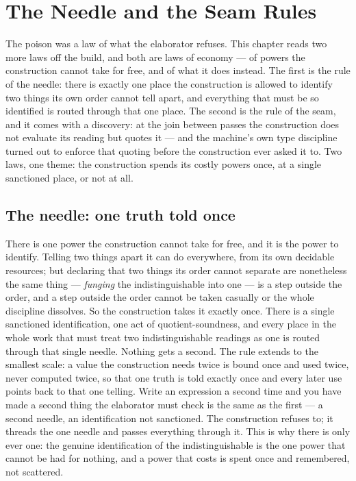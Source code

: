 \chapter{The Needle and the Seam Rules}
\label{chap:needle-and-seam-rules}

The poison was a law of what the elaborator refuses. This chapter reads two more laws off the build, and
both are laws of economy --- of powers the construction cannot take for free, and of what it does instead.
The first is the rule of the needle: there is exactly one place the construction is allowed to identify two
things its own order cannot tell apart, and everything that must be so identified is routed through that one
place. The second is the rule of the seam, and it comes with a discovery: at the join between passes the
construction does not evaluate its reading but quotes it --- and the machine's own type discipline turned
out to enforce that quoting before the construction ever asked it to. Two laws, one theme: the construction
spends its costly powers once, at a single sanctioned place, or not at all.

\section{The needle: one truth told once}
\label{se:the-needle-one-truth-told-once}

There is one power the construction cannot take for free, and it is the power to identify. Telling two
things apart it can do everywhere, from its own decidable resources; but declaring that two things its order
cannot separate are nonetheless the same thing --- \emph{funging} the indistinguishable into one --- is a
step outside the order, and a step outside the order cannot be taken casually or the whole discipline
dissolves. So the construction takes it exactly once. There is a single sanctioned identification, one act
of quotient-soundness, and every place in the whole work that must treat two indistinguishable readings as
one is routed through that single needle. Nothing gets a second. The rule extends to the smallest scale: a
value the construction needs twice is bound once and used twice, never computed twice, so that one truth is
told exactly once and every later use points back to that one telling. Write an expression a second time and
you have made a second thing the elaborator must check is the same as the first --- a second needle, an
identification not sanctioned. The construction refuses to; it threads the one needle and passes everything
through it. This is why there is only ever one: the genuine identification of the indistinguishable is the
one power that cannot be had for nothing, and a power that costs is spent once and remembered, not scattered.

